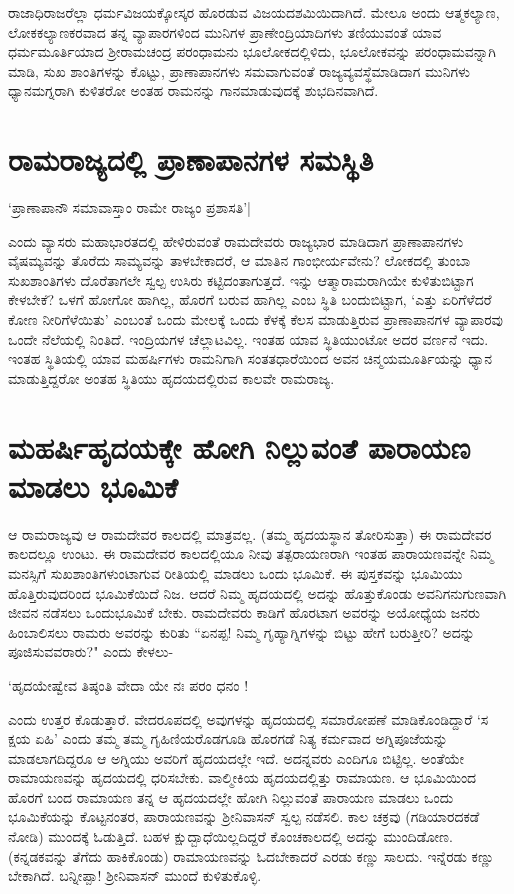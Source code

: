 ರಾಜಾಧಿರಾಜರೆಲ್ಲಾ ಧರ್ಮವಿಜಯಕ್ಕೋಸ್ಕರ ಹೊರಡುವ ವಿಜಯದಶಮಿಯಿದಾಗಿದೆ. ಮೇಲೂ ಅಂದು ಆತ್ಮಕಲ್ಯಾಣ, ಲೋಕಕಲ್ಯಾಣಕರವಾದ ತನ್ನ ವ್ಯಾಪಾರಗಳಿಂದ ಮುನಿಗಳ ಪ್ರಾಣೇಂದ್ರಿಯಾದಿಗಳು ತಣಿಯುವಂತೆ ಯಾವ ಧರ್ಮಮೂರ್ತಿಯಾದ ಶ್ರೀರಾಮಚಂದ್ರ ಪರಂಧಾಮನು ಭೂಲೋಕದಲ್ಲಿಳಿದು, ಭೂಲೋಕವನ್ನು ಪರಂಧಾಮವನ್ನಾಗಿ ಮಾಡಿ, ಸುಖ ಶಾಂತಿಗಳನ್ನು ಕೊಟ್ಟು, ಪ್ರಾಣಾಪಾನಗಳು ಸಮವಾಗುವಂತೆ ರಾಜ್ಯವ್ಯವಸ್ಥೆಮಾಡಿದಾಗ ಮುನಿಗಳು ಧ್ಯಾನಮಗ್ನರಾಗಿ ಕುಳಿತರೋ ಅಂತಹ ರಾಮನನ್ನು ಗಾನಮಾಡುವುದಕ್ಕೆ ಶುಭದಿನವಾಗಿದೆ. 

\section*{ರಾಮರಾಜ್ಯದಲ್ಲಿ ಪ್ರಾಣಾಪಾನಗಳ ಸಮಸ್ಥಿತಿ} 

\begin{shloka} 
`ಪ್ರಾಣಾಪಾನೌ ಸಮಾವಾಸ್ತಾಂ ರಾಮೇ ರಾಜ್ಯಂ ಪ್ರಶಾಸತಿ'|\label{161}
\end{shloka} 

ಎಂದು ವ್ಯಾಸರು ಮಹಾಭಾರತದಲ್ಲಿ ಹೇಳಿರುವಂತೆ ರಾಮದೇವರು ರಾಜ್ಯಭಾರ ಮಾಡಿದಾಗ ಪ್ರಾಣಾಪಾನಗಳು ವೈಷಮ್ಯವನ್ನು ತೊರೆದು ಸಾಮ್ಯವನ್ನು ತಾಳಬೇಕಾದರೆ, ಆ ಮಾತಿನ ಗಾಂಭೀರ್ಯವೇನು? ಲೋಕದಲ್ಲಿ ತುಂಬಾ ಸುಖಶಾಂತಿಗಳು ದೊರೆತಾಗಲೇ ಸ್ವಲ್ಪ ಉಸಿರು ಕಟ್ಟಿದಂತಾಗುತ್ತದೆ. ಇನ್ನು ಆತ್ಮಾರಾಮರಾಗಿಯೇ ಕುಳಿತುಬಿಟ್ಟಾಗ ಕೇಳಬೇಕೆ? ಒಳಗೆ ಹೋಗೋ ಹಾಗಿಲ್ಲ, ಹೊರಗೆ ಬರುವ ಹಾಗಿಲ್ಲ ಎಂಬ ಸ್ಥಿತಿ ಬಂದುಬಿಟ್ಟಾಗ, `ಎತ್ತು ಏರಿಗೆಳೆದರೆ ಕೋಣ ನೀರಿಗೆಳೆಯಿತು' ಎಂಬಂತೆ ಒಂದು ಮೇಲಕ್ಕೆ ಒಂದು ಕೆಳಕ್ಕೆ ಕೆಲಸ ಮಾಡುತ್ತಿರುವ ಪ್ರಾಣಾಪಾನಗಳ ವ್ಯಾಪಾರವು ಒಂದೇ ನೆಲೆಯಲ್ಲಿ ನಿಂತಿದೆ. ಇಂದ್ರಿಯಗಳ ಚೆಲ್ಲಾಟವಿಲ್ಲ. ಇಂತಹ ಯಾವ ಸ್ಥಿತಿಯುಂಟೋ ಅದರ ವರ್ಣನೆ ಇದು. ಇಂತಹ ಸ್ಥಿತಿಯಲ್ಲಿ ಯಾವ ಮಹರ್ಷಿಗಳು ರಾಮನಿಗಾಗಿ ಸಂತತಧಾರೆಯಿಂದ ಅವನ ಚಿನ್ಮಯಮೂರ್ತಿಯನ್ನು ಧ್ಯಾನ ಮಾಡುತ್ತಿದ್ದರೋ ಅಂತಹ ಸ್ಥಿತಿಯು ಹೃದಯದಲ್ಲಿರುವ ಕಾಲವೇ ರಾಮರಾಜ್ಯ. 

\section*{ಮಹರ್ಷಿಹೃದಯಕ್ಕೇ ಹೋಗಿ ನಿಲ್ಲುವಂತೆ ಪಾರಾಯಣ ಮಾಡಲು ಭೂಮಿಕೆ} 

ಆ ರಾಮರಾಜ್ಯವು ಆ ರಾಮದೇವರ ಕಾಲದಲ್ಲಿ ಮಾತ್ರವಲ್ಲ. (ತಮ್ಮ ಹೃದಯಸ್ಥಾನ ತೋರಿಸುತ್ತಾ) ಈ ರಾಮದೇವರ ಕಾಲದಲ್ಲೂ ಉಂಟು. ಈ ರಾಮದೇವರ ಕಾಲದಲ್ಲಿಯೂ ನೀವು ತತ್ಪರಾಯಣರಾಗಿ ಇಂತಹ ಪಾರಾಯಣವನ್ನೇ ನಿಮ್ಮ ಮನಸ್ಸಿಗೆ ಸುಖಶಾಂತಿಗಳುಂಟಾಗುವ ರೀತಿಯಲ್ಲಿ ಮಾಡಲು ಒಂದು ಭೂಮಿಕೆ. ಈ ಪುಸ್ತಕವನ್ನು ಭೂಮಿಯು ಹೊತ್ತಿರುವುದರಿಂದ ಭೂಮಿಕೆಯಿದೆ ನಿಜ. ಆದರೆ ನಿಮ್ಮ ಹೃದಯದಲ್ಲಿ ಅದನ್ನು ಹೊತ್ತುಕೊಂಡು ಅವನಿಗನುಗುಣವಾಗಿ ಜೀವನ ನಡೆಸಲು ಒಂದುಭೂಮಿಕೆ ಬೇಕು. ರಾಮದೇವರು ಕಾಡಿಗೆ ಹೊರಟಾಗ ಅವರನ್ನು ಅಯೋಧ್ಯೆಯ ಜನರು ಹಿಂಬಾಲಿಸಲು ರಾಮರು ಅವರನ್ನು ಕುರಿತು ``ಏನಪ್ಪ! ನಿಮ್ಮ ಗೃಹ್ಯಾಗ್ನಿಗಳನ್ನು ಬಿಟ್ಟು ಹೇಗೆ ಬರುತ್ತೀರಿ? ಅದನ್ನು ಪೂಜಿಸುವವರಾರು?" ಎಂದು ಕೇಳಲು- 

\begin{shloka} 
`ಹೃದಯೇಷ್ವೇವ ತಿಷ್ಠಂತಿ ವೇದಾ ಯೇ ನಃ ಪರಂ ಧನಂ !
\end{shloka} 

ಎಂದು ಉತ್ತರ ಕೊಡುತ್ತಾರೆ. ವೇದರೂಪದಲ್ಲಿ ಅವುಗಳನ್ನು ಹೃದಯದಲ್ಲಿ ಸಮಾರೋಪಣೆ ಮಾಡಿಕೊಂಡಿದ್ದಾರೆ `ಸ ಕ್ಷಯ ಏಹಿ' ಎಂದು ತಮ್ಮ ತಮ್ಮ ಗೃಹಿಣಿಯರೊಡಗೂಡಿ ಹೊರಗಡೆ ನಿತ್ಯ ಕರ್ಮವಾದ ಅಗ್ನಿಪೂಜೆಯನ್ನು ಮಾಡಲಾಗದಿದ್ದರೂ ಆ ಅಗ್ನಿಯು ಅವರಿಗೆ ಹೃದಯದಲ್ಲೇ ಇದೆ. ಅದನ್ನವರು ಎಂದಿಗೂ ಬಿಟ್ಟಿಲ್ಲ. ಅಂತೆಯೇ ರಾಮಾಯಣವನ್ನು ಹೃದಯದಲ್ಲಿ ಧರಿಸಬೇಕು. ವಾಲ್ಮೀಕಿಯ ಹೃದಯದಲ್ಲಿತ್ತು ರಾಮಾಯಣ. ಆ ಭೂಮಿಯಿಂದ ಹೊರಗೆ ಬಂದ ರಾಮಾಯಣ ತನ್ನ ಆ ಹೃದಯದಲ್ಲೇ ಹೋಗಿ ನಿಲ್ಲುವಂತೆ ಪಾರಾಯಣ ಮಾಡಲು ಒಂದು ಭೂಮಿಕೆಯನ್ನು ಕೊಟ್ಟನಂತರ, ಪಾರಾಯಣವನ್ನು ಶ್ರೀನಿವಾಸನ್‍ ಸ್ವಲ್ಪ ನಡೆಸಲಿ. ಕಾಲ ಚಕ್ರವು (ಗಡಿಯಾರದಕಡೆ ನೋಡಿ) ಮುಂದಕ್ಕೆ ಓಡುತ್ತಿದೆ. ಬಹಳ ಕ್ಷುದ್ಬಾಧೆಯಿಲ್ಲದಿದ್ದರೆ ಕೊಂಚಕಾಲದಲ್ಲಿ ಅದನ್ನು ಮುಂದಿಡೋಣ. (ಕನ್ನಡಕವನ್ನು ತೆಗೆದು ಹಾಕಿಕೊಂಡು) ರಾಮಾಯಣವನ್ನು ಓದಬೇಕಾದರೆ ಎರಡು ಕಣ್ಣು ಸಾಲದು. ಇನ್ನೆರಡು ಕಣ್ಣು ಬೇಕಾಗಿದೆ. ಬನ್ನೀಪ್ಪಾ! ಶ್ರೀನಿವಾಸನ್‍ ಮುಂದೆ ಕುಳಿತುಕೊಳ್ಳಿ. 

